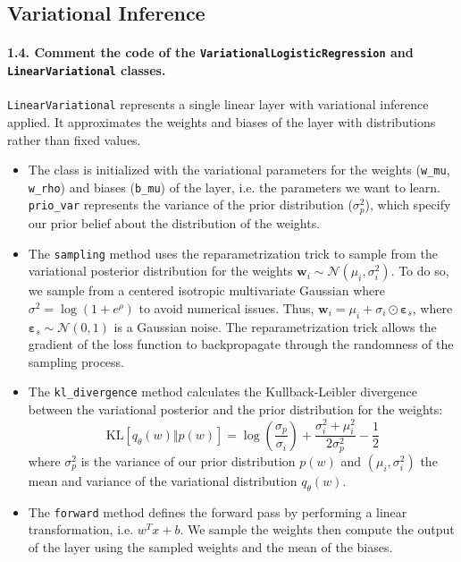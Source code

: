 \subsection{Variational Inference}
\paragraph{1.4. Comment the code of the \texttt{VariationalLogisticRegression} and \texttt{LinearVariational} classes.}

\noindent\texttt{LinearVariational} represents a single linear layer with variational inference applied. It approximates the weights and biases of the layer with distributions rather than fixed values.
\begin{itemize}
    \item The class is initialized with the variational parameters for the weights (\texttt{w\_mu}, \texttt{w\_rho}) and biases (\texttt{b\_mu}) of the layer, i.e. the parameters we want to learn. \texttt{prio\_var} represents the variance of the prior distribution ($\sigma^2_p$), which specify our prior belief about the distribution of the weights. 
    \item The \texttt{sampling} method uses the reparametrization trick to sample from the variational posterior distribution for the weights $\boldsymbol{w}_{i} \sim \mathcal{N}(\mu_{i}, \sigma_{i}^2)$. To do so, we sample from a centered isotropic multivariate Gaussian where $ \sigma^2 = \log(1 + e^{\rho}) $ to avoid numerical issues. Thus, $ \boldsymbol{w}_{i} = \mu_{i}+ \sigma_{i} \odot \boldsymbol{\varepsilon}_s $, where $\boldsymbol{\varepsilon}_s \sim \mathcal{N}(0, 1)$ is a Gaussian noise. The reparametrization trick allows the gradient of the loss function to backpropagate through the randomness of the sampling process. 
    \item The \texttt{kl\_divergence} method calculates the Kullback-Leibler divergence between the variational posterior and the prior distribution for the weights: \[
    \textrm{KL}\left[q_{\theta}(w) \Vert p(w) \right]= \log\left(\frac{\sigma_{p}}{\sigma_{i}}\right) + \frac{\sigma_i^2+\mu_i^2}{2\sigma_{p}^2} - \frac{1}{2} \]
    where $\sigma^2_p$ is the variance of our prior distribution $p(w)$ and $(\mu_i, \sigma^2_i)$ the mean and variance of the variational distribution $q_{\theta}(w)$.
    \item The \texttt{forward} method defines the forward pass by performing a linear transformation, i.e. $w^T x + b$. We sample the weights then compute the output of the layer using the sampled weights and the mean of the biases.
\end{itemize}

